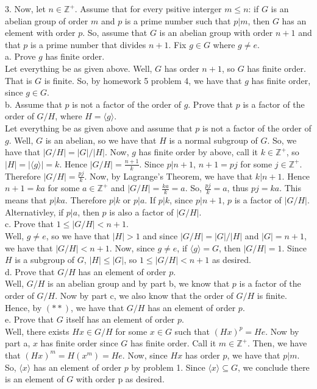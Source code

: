 \documentclass[12pt]{article}
\begin{document}
3. Now, let $n\in\mathbb{Z}^+$. Assume that for every psitive interger $m\leq n$: if $G$ is an abelian group of order $m$ and $p$ is a prime number such that $p|m$, then $G$ has an element with order $p$. So, assume that $G$ is an abelian group with order $n+1$ and that $p$ is a prime number that divides $n+1$. Fix $g\in G$ where $g\neq e$.\\
a. Prove $g$ has finite order.\\
Let everything be as given above. Well, $G$ has order $n+1$, so $G$ has finite order. That is $G$ is finite. So, by homework 5 problem 4, we have that $g$ has finite order, since $g\in G$.\\[8pt]
b. Assume that $p$ is not a factor of the order of $g$. Prove that $p$ is a factor of the order of $G/H$, where $H=\langle g\rangle$.\\
Let everything be as given above and assume that $p$ is not a factor of the order of $g$. Well, $G$ is an abelian, so we have that $H$ is a normal subgroup of $G$. So, we have that $|G/H|=|G|/|H|$. Now, $g$ has finite order by above, call it $k\in\mathbb{Z}^+$, so $|H|=|\langle g\rangle|=k$. Hence $|G/H|=\frac{n+1}{k}$. Since $p|n+1$, $n+1=pj$ for some $j\in\mathbb{Z}^+$. Therefore $|G/H|=\frac{pj}{k}$. Now, by Lagrange's Theorem, we have that $k|n+1$. Hence $n+1=ka$ for some $a\in\mathbb{Z}^+$ and $|G/H|=\frac{ka}{k}=a$. So, $\frac{pj}{k}=a$, thus $pj=ka$. This means that $p|ka$. Therefore $p|k$ or $p|a$. If $p|k$, since $p|n+1$, $p$ is a factor of $|G/H|$. Alternativley, if $p|a$, then $p$ is also a factor of $|G/H|$.\\[8pt]
c. Prove that $1\leq|G/H|<n+1$.\\
Well, $g\neq e$, so we have that $|H|>1$ and since $|G/H|=|G|/|H|$ and $|G|=n+1$, we have that $|G/H|<n+1$. Now, since $g\neq e$, if $\langle g\rangle=G$, then $|G/H|=1$. Since $H$ is a subgroup of $G$, $|H|\leq|G|$, so $1\leq|G/H|<n+1$ as desired.\\[8pt]
d. Prove that $G/H$ has an element of order $p$.\\
Well, $G/H$ is an abelian group and by part b, we know that $p$ is a factor of the order of $G/H$. Now by part c, we also know that the order of $G/H$ is finite. Hence, by $(**)$, we have that $G/H$ has an element of order $p$.\\[8pt]
e. Prove that $G$ itself has an element of order $p$.\\
Well, there exists $Hx\in G/H$ for some $x\in G$ such that $(Hx)^p=He$. Now by part a, $x$ has finite order since $G$ has finite order. Call it $m\in\mathbb{Z}^+$. Then, we have that $(Hx)^m=H(x^m)=He$. Now, since $Hx$ has order $p$, we have that $p|m$. So, $\langle x\rangle$ has an element of order $p$ by problem 1. Since $\langle x\rangle\subseteq G$, we conclude there is an element of $G$ with order p as desired.\\[20pt]
\end{document}
